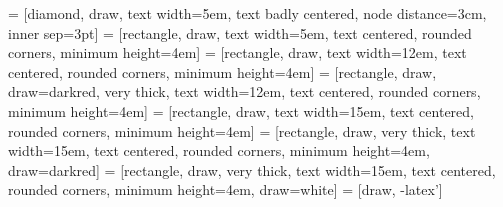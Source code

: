 \documentclass{article}
\begin{document}
\newcommand{\mcode} {\texttt{GS\_MotherCode.r}{ }}
\newcommand{\bigtt}[1] {\textcolor{darkblue}{{\large {\texttt{#1}}}}}
\renewcommand{\tablename}{Tableau}
\makeatletter
 \newcommand{\nop}[1]{\Hy@raisedlink{\hypertarget{#1}{}}}
\makeatother


\tableofcontents

 = [diamond, draw,
    text width=5em, text badly centered, node distance=3cm, inner sep=3pt]
 = [rectangle, draw,
    text width=5em, text centered, rounded corners, minimum height=4em]
 = [rectangle, draw,
    text width=12em, text centered, rounded corners, minimum height=4em]
 = [rectangle, draw, draw=darkred, very thick,
   text width=12em, text centered, rounded corners, minimum height=4em]
 = [rectangle, draw,
    text width=15em, text centered, rounded corners, minimum height=4em]
 = [rectangle, draw, very thick,
    text width=15em, text centered, rounded corners, minimum
    height=4em, draw=darkred]
 = [rectangle, draw, very thick,
    text width=15em, text centered, rounded corners, minimum
    height=4em, draw=white]
 = [draw, -latex']
\end{document}
